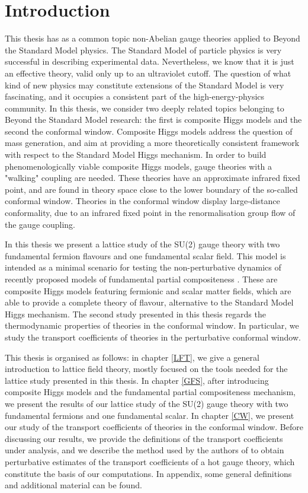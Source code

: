 \chapter{Introduction}

This thesis has as a common topic non-Abelian gauge theories applied to Beyond the Standard Model physics.
The Standard Model of particle physics is very successful in describing experimental data. Nevertheless, we know that it is just an effective theory, valid only up to an ultraviolet cutoff. 
The question of what kind of new physics may constitute extensions of the Standard Model is very fascinating, and it occupies a consistent part of the high-energy-physics community. 
In this thesis, we consider two deeply related topics belonging to Beyond the Standard Model research: the first is composite Higgs models and the second the conformal window.
Composite Higgs models address the question of mass generation, and aim at providing a more theoretically consistent framework with respect to the Standard Model Higgs mechanism. 
In order to build phenomenologically viable composite Higgs models, gauge theories with a "walking" coupling are needed. These theories have an approximate infrared fixed point, and are found in theory space close to the lower boundary of the so-called conformal window. Theories in the conformal window display large-distance conformality, due to an infrared fixed point in the renormalisation group flow of the gauge coupling.

In this thesis we present a lattice study of the SU(2) gauge theory with two fundamental fermion flavours and one fundamental scalar field. This model is intended as a minimal scenario for testing the non-perturbative dynamics of recently proposed models of  fundamental partial compositeness \cite{Sannino:2016sfx}. These are composite Higgs models featuring fermionic and scalar matter fields, which are able to provide a complete theory of flavour, alternative to the Standard Model Higgs mechanism. 
The second study presented in this thesis regards the thermodynamic properties of theories in the conformal window. In particular, we study the transport coefficients of theories in the perturbative conformal window.

This thesis is organised as follows: in chapter \ref{LFT}, we give a general introduction to lattice field theory, mostly focused on the tools needed for the lattice study presented in this thesis. In chapter \ref{GFS}, after introducing composite Higgs models and the fundamental partial compositeness mechanism, we present the results of our lattice study of the SU(2) gauge theory with two fundamental fermions and one fundamental scalar. In chapter \ref{CW}, we present our study of the transport coefficients of theories in the conformal window. Before discussing our results, we provide the definitions of the transport coefficients under analysis, and we describe the method used by the authors of \cite{Arnold:2000dr} to obtain perturbative estimates of the transport coefficients of a hot gauge theory, which constitute the basis of our computations.
In appendix, some general definitions and additional material can be found.